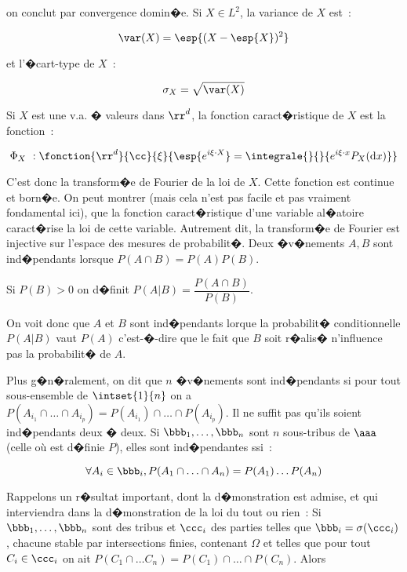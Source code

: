 on conclut par convergence domin�e.
 Si $X\in L^2$, la variance de $X$ est~:\par
$$\var (X) = \esp{(X-\esp{X})^2}$$\par
et l'�cart-type de $X$~:\par
$$\sigma_X = \sqrt{\var(X)}$$\par
{} Si $X$ est une v.a. � valeurs dans ${\rr}^d$, la fonction caract�ristique de $X$ est la 
fonction~:\par
$$\Phi_X~:\fonction{{\rr}^d}{\cc}{\xi}{\esp{e^{i\xi\cdot X}} = \integrale{}{}{e^{i\xi\cdot x}P_X(\mathrm{d}{x})}}$$\par
C'est donc la transform�e de Fourier de la loi de $X$. Cette fonction est continue et born�e. On peut montrer (mais cela n'est pas 
facile et pas vraiment fondamental ici), que la fonction caract�ristique d'une variable al�atoire caract�rise la loi de cette variable. 
Autrement dit, la transform�e de Fourier est injective sur l'espace des mesures de probabilit�.
 Deux �v�nements $A,B$ sont ind�pendants lorsque $P(A\cap B) = P(A)P(B)$.\par
{} Si $P(B)>0$ on d�finit $P(A|B) = \dfrac{P(A\cap B)}{P(B)}$.\par
On voit donc que $A$ et $B$ sont ind�pendants lorque la probabilit� conditionnelle $P(A|B)$ vaut $P(A)$ c'est-�-dire que le fait que
$B$ soit r�alis� n'influence pas la probabilit� de $A$.\par
Plus g�n�ralement, on dit que $n$ �v�nements sont ind�pendants si pour tout sous-ensemble de $\intset{1}{n}$ on a $P(A_{i_1}\cap\ldots
\cap A_{i_p}) = P(A_{i_1})\cap\ldots \cap P(A_{i_p})$. Il ne suffit pas qu'ils soient ind�pendants deux � deux.
 Si $\bbb_1,\ldots,\bbb_n$ sont $n$ sous-tribus de $\aaa$ (celle o\`u est d�finie $P$), elles sont 
ind�pendantes ssi~:\par
$$\forall A_i\in \bbb_i, P(A_1\cap\ldots\cap A_n) = P(A_1)\ldots P(A_n)$$\par
Rappelons un r�sultat important, dont la d�monstration est admise, et qui interviendra dans la d�\-mon\-stra\-tion de la loi du tout ou 
rien~:
\theoreme{}
Si $\bbb_1,\ldots,\bbb_n$ sont des tribus et $\ccc_i$ des parties telles que $\bbb_i = \sigma(\ccc_i)$, chacune stable par intersections
finies, contenant $\Omega$ et telles que pour tout $C_i\in \ccc_i$ on ait $P(C_1\cap\ldots C_n) = P(C_1)\cap\ldots\cap P(C_n)$. Alors 

